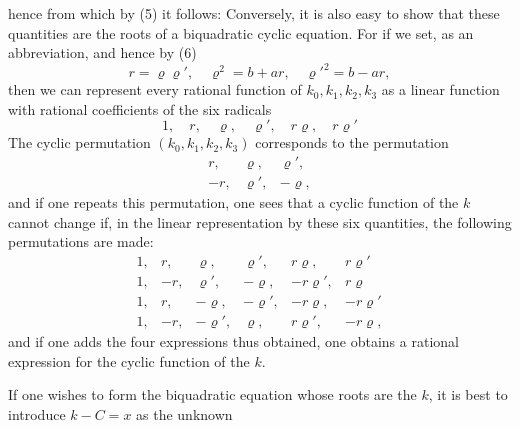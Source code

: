 hence
from which by (5) it follows:
Conversely, it is also easy to show that these quantities
are the roots of a biquadratic cyclic equation.
For if we set, as an abbreviation,
and hence by (6)
\[ r = \varrho\varrho', \quad \varrho^2 = b+ar, \quad \varrho'^2 = b-ar, \]
then we can represent every rational function of $k_0, k_1, k_2, k_3$ as a linear
function with rational coefficients of the six radicals
\[ 1, \quad r, \quad \varrho, \quad \varrho', \quad r\varrho, \quad r\varrho' \]
The cyclic permutation $(k_0, k_1, k_2, k_3)$ corresponds
to the permutation
\[
\begin{array}{lll}
r, & \varrho, & \varrho',\\
-r, & \varrho', & -\varrho,
\end{array}
\]
and if one repeats this permutation, one sees
that a cyclic function of the $k$ cannot change
if, in the linear representation by these six quantities,
the following permutations are made:
\[
\begin{array}{llllll}
1, & r, & \varrho, & \varrho', & r\varrho, & r\varrho'\\
1, & -r, & \varrho', & -\varrho, & -r\varrho', & r\varrho\\
1, & r, & -\varrho, & -\varrho', & -r\varrho, & -r\varrho'\\
1, & -r, & -\varrho', & \varrho, & r\varrho', & -r\varrho,
\end{array}
\]
and if one adds the four expressions thus obtained,
one obtains a rational expression for the cyclic function
of the $k$.

If one wishes to form the biquadratic equation whose roots
are the $k$, it is best to introduce $k - C = x$ as the unknown

